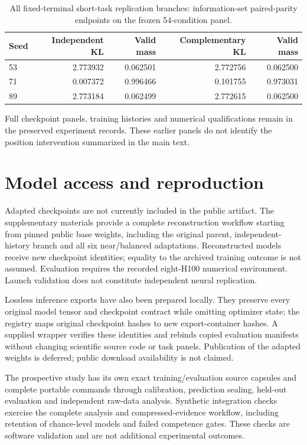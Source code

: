\documentclass{article}
\begin{document}
\begin{table}[h]
\centering\small
\caption{All fixed-terminal short-task replication branches: information-set
paired-parity endpoints on the frozen 54-condition panel.}
\label{tab:prior-terminal}
\begin{tabular}{@{}lrrrr@{}}
\toprule
Seed & Independent KL & Valid mass & Complementary KL & Valid mass\\
\midrule
53 & 2.773932 & 0.062501 & 2.772756 & 0.062500\\
71 & 0.007372 & 0.996466 & 0.101755 & 0.973031\\
89 & 2.773184 & 0.062499 & 2.772615 & 0.062500\\
\bottomrule
\end{tabular}
\end{table}



Full checkpoint panels, training histories and numerical qualifications remain
in the preserved experiment records. These earlier panels do not identify
the position intervention summarized in the main text.
\section{Model access and reproduction}
Adapted checkpoints are not currently included in the public artifact. The
supplementary materials provide a complete reconstruction workflow starting
from pinned public base weights, including the original parent,
independent-history branch and all six near/balanced adaptations. Reconstructed
models receive new checkpoint identities; equality to the archived training
outcome is not assumed. Evaluation requires the recorded eight-H100 numerical
environment. Launch validation does not constitute independent neural replication.

Lossless inference exports have also been prepared locally. They preserve every
original model tensor and checkpoint contract while omitting optimizer state;
the registry maps original checkpoint hashes to new export-container hashes.
A supplied wrapper verifies these identities and rebinds copied evaluation
manifests without changing scientific source code or task panels. Publication
of the adapted weights is deferred; public download availability is not claimed.

The prospective study has its own exact training/evaluation source capsules and
complete portable commands through calibration, prediction sealing, held-out
evaluation and independent raw-data analysis. Synthetic integration checks
exercise the complete analysis and compressed-evidence workflow, including
retention of chance-level models and failed competence gates. These checks are
software validation and are not additional experimental outcomes.
\end{document}
